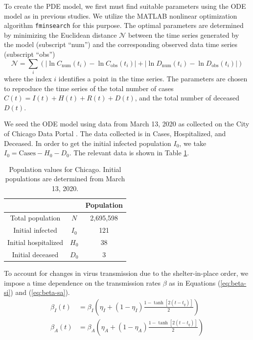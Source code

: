\documentclass[11pt]{article}
\begin{document}
	To create the PDE model, we first must find suitable parameters using the ODE model as in previous studies.
	We utilize the MATLAB nonlinear optimization algorithm \verb|fminsearch| for this purpose.
	The optimal parameters are determined by minimizing the Euclidean distance $\mathcal{N}$ between the time series generated by the model (subscript ``num'') and the corresponding observed data time series (subscript ``obs'')
	\begin{equation} \label{eq:objfun}
		\mathcal{N} = \sum_i \left( \left| \ln C_\mathrm{num} (t_i) - \ln C_\mathrm{obs} (t_i) \right| + \left| \ln D_\mathrm{num} (t_i) - \ln D_\mathrm{obs} (t_i) \right| \right)
	\end{equation}
	where the index $i$ identifies a point in the time series.
	The parameters are chosen to reproduce the time series of the total number of cases $C(t) = I(t) + H(t) + R(t) + D(t)$, and the total number of deceased $D(t)$.
	
	We seed the ODE model using data from March 13, 2020 as collected on the City of Chicago Data Portal \cite{Chicago-cases}.
	The data collected is in Cases, Hospitalized, and Deceased.
	In order to get the initial infected population $I_0$, we take $I_0 = \mathrm{Cases} - H_0 - D_0$.
	The relevant data is shown in Table \ref{tab:populations}.
	\begin{table}[h]
		\centering
		\caption{Population values for Chicago.
			Initial populations are determined from March 13, 2020.}
		\label{tab:populations}
		\begin{tabular}{ c c c }
			\hline
			\hline
			&	&	Population \\
			\hline
			Total population		&	$N$		&	2,695,598 \\
			Initial infected		&	$I_0$	&	121	\\
			Initial hospitalized	&	$H_0$	&	38 \\
			Initial deceased		&	$D_0$	&	3 \\
			\hline
			\hline
		\end{tabular}
	\end{table}

	To account for changes in virus transmission due to the shelter-in-place order, we impose a time dependence on the transmission rates $\beta$ as in Equations (\ref{eq:beta-si}) and (\ref{eq:beta-sa}).
	\begin{align}
		\label{eq:beta-si}
		\beta_{I} (t) &= \beta_{I} \left( \eta_{I} + (1 - \eta_{I}) \frac{1 - \tanh [2(t - t_q)]}{2} \right) \\
		\label{eq:beta-sa}
		\beta_{A} (t) &= \beta_{A} \left( \eta_{A} + (1 - \eta_{A}) \frac{1 - \tanh [2(t - t_q)]}{2} \right)
	\end{align}
	
\end{document}
